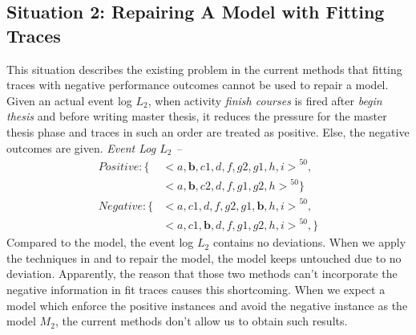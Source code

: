 \subsection{Situation 2: \small{Repairing A Model with Fitting Traces}}
This situation describes the existing problem in the current methods that fitting traces with negative performance outcomes cannot be used to repair a model. Given an actual event log $L_2$, when activity \emph{finish courses} is fired after \emph{begin thesis} and before writing master thesis, it reduces the pressure for the master thesis phase and traces in such an order are treated as positive. Else, the negative outcomes are given. 
\emph{Event Log $L_2$ -- }
\begin{align*}
Positive:\{ & { <a,\textbf{b},c1,d,f,g2,g1,h,i>}^{50}, \\   &{<a,\textbf{b},c2,d,f,g1,g2,h>}^{50} \}  \\
Negative: \{ & {<a,c1,d,f,g2,g1,\textbf{b},h,i>}^{50}, \\
& {<a,c1,\textbf{b},d,f,g1,g2,h,i>}^{50},  \}
\end{align*}
Compared to the model, the event log $L_2$ contains no deviations. When we apply the techniques in \cite{fahland2015model} and \cite{dees2017enhancing} to repair the model, the model keeps untouched due to no deviation. Apparently, the reason that those two methods can't incorporate the negative information in fit traces causes this shortcoming. When we expect a model which enforce the positive instances and avoid the negative instance as the model $M_2$, the current methods don't allow us to obtain such results. 
